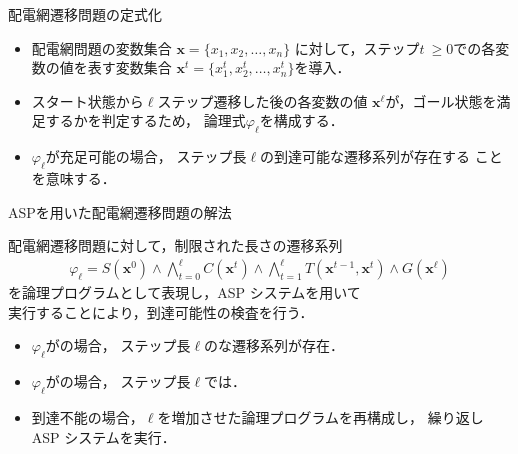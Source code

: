 \documentclass[dvipdfmx,11pt]{beamer}
\begin{document}
\begin{frame}[noframenumbering]{配電網遷移問題の定式化}
  \begin{itemize}
  \item 配電網問題の変数集合
    $\boldsymbol{x} = \{x_1,x_2,\ldots,x_n\}$
    に対して，ステップ$t~\geq 0$での各変数の値を表す変数集合
    $\boldsymbol{x}^{t} = \{x_1^t,x_2^t,\ldots,x_n^t\}$を導入．
  \item スタート状態から$\ell$ステップ遷移した後の各変数の値
    $\boldsymbol{x}^{\ell}$が，ゴール状態を満足するかを判定するため，
    論理式$\varphi_{\ell}$を構成する．
  \end{itemize}
  \begin{itemize}
  \item {$\varphi_{\ell}$}が充足可能の場合，
    ステップ長$\ell$の到達可能な遷移系列が存在する
    ことを意味する．
  \end{itemize}
\end{frame}
\begin{frame}{ASPを用いた配電網遷移問題の解法} 
  \begin{alertblock}{}\centering
    配電網遷移問題に対して，制限された長さの遷移系列
    \begin{align*}
    \varphi_{\ell} = S(\boldsymbol{x}^0)  
    \land \bigwedge_{t=0}^{\ell} C(\boldsymbol{x}^t) 
    \land \bigwedge_{t=1}^{\ell} T(\boldsymbol{x}^{t-1},\boldsymbol{x}^{t}) 
    \land G(\boldsymbol{x}^\ell)  
        \end{align*}
    を論理プログラムとして表現し，ASP システムを用いて\\
   実行することにより，到達可能性の検査を行う．
  \end{alertblock}\vfill
  \begin{itemize}
   \item $\varphi_{\ell}$がの場合，
         ステップ長$\ell$のな遷移系列が存在．
   \item $\varphi_{\ell}$がの場合，
         ステップ長$\ell$では．
   \item 到達不能の場合，$\ell$を増加させた論理プログラムを再構成し，
         繰り返し ASP システムを実行．
  \end{itemize}
\end{frame}
\end{document}
